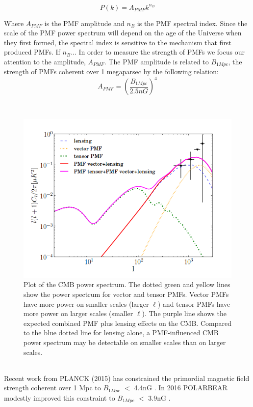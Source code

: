 \begin{equation}
P(k) = A_{PMF}k^{n_B}
\end{equation}

Where $A_{PMF}$ is the PMF amplitude and $n_{B}$ is the PMF spectral index. Since the scale of the PMF power spectrum will depend on the age of the Universe when they first formed, the spectral index is sensitive to the mechanism that first produced PMFs. If $n_{B}$...
In order to measure the strength of PMFs we focus our attention to the amplitude, $A_{PMF}$. The PMF amplitude is related to $B_{1Mpc}$, the strength of PMFs coherent over 1 megaparsec by the following relation:
\begin{equation}
A_{PMF} = (\frac{B_{1Mpc}}{2.5nG})^4
\end{equation}

\\
\begin{figure}[h]
\centering
\includegraphics[scale=0.7]{images/PMFpower.png} 
\caption{Plot of the CMB power spectrum. The dotted green and yellow lines show the power spectrum for vector and tensor PMFs. Vector PMFs have more power on smaller scales (larger $\ell$) and tensor PMFs have more power on larger scales (smaller $\ell$). The purple line shows the expected combined PMF plus lensing effects on the CMB. Compared to the blue dotted line for lensing alone, a PMF-influenced CMB power spectrum may be detectable on smaller scales than on larger scales.}
\end{figure}
\\

Recent work from PLANCK (2015) has constrained the primordial magnetic field strength coherent over 1 Mpc to $B_{1Mpc}$ $<$ 4.4nG \cite{Ade:2015cva}. In 2016 POLARBEAR modestly improved this constraint to $B_{1Mpc}$ $<$ 3.9nG \cite{Ade:2015cao}.
